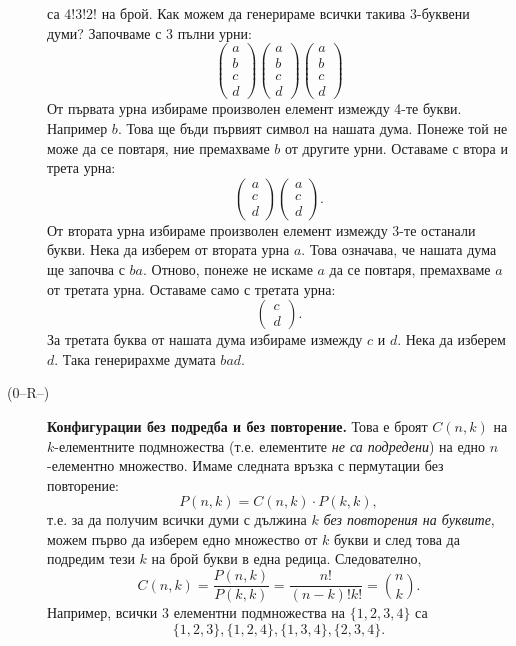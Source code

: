 \begin{description}
  са $4!3!2!$ на брой.
  Как можем да генерираме всички такива 3-буквени думи?
  Започваме с 3 пълни урни:
  \[
  \left(\begin{array}{c}
      a\\
      b\\
      c\\
      d
      \end{array}
    \right)
  \left(\begin{array}{c}
      a\\
      b\\
      c\\
      d
      \end{array}
    \right)
  \left(\begin{array}{c}
      a\\
      b\\
      c\\
      d
      \end{array}
    \right)
  \]
  От първата урна избираме произволен елемент измежду 4-те букви. Например $b$.
  Това ще бъди първият символ на нашата дума. Понеже той не може да се повтаря,
  ние премахваме $b$ от другите урни. Оставаме с втора и трета урна:
  \[
  \left(\begin{array}{c}
      a\\
      c\\
      d
      \end{array}
    \right)
  \left(\begin{array}{c}
      a\\
      c\\
      d
      \end{array}
    \right).
    \]
    От втората урна избираме произволен елемент измежду 3-те останали букви.
    Нека да изберем от втората урна $a$.
    Това означава, че нашата дума ще започва с $ba$.
    Отново, понеже не искаме $a$ да се повтаря, премахваме $a$ от третата урна. Оставаме само с третата урна:
      \[
      \left(\begin{array}{c}
          c\\
          d
        \end{array}
      \right).
    \]
    За третата буква от нашата дума избираме измежду $c$ и $d$.
    Нека да изберем $d$.
    Така генерирахме думата $bad$.
  \item[(0--R--)]
  {\bf Конфигурации без подредба и без повторение.}
  Това е броят $C(n,k)$ на $k$-елементните подмножества (т.е. елементите {\em не са подредени}) на едно $n$-елементно множество.
  Имаме следната връзка с пермутации без повторение:
  \[P(n,k) = C(n,k)\cdot P(k,k),\] 
  т.е. за да получим всички думи с дължина $k$ {\em без повторения на буквите},
  можем първо да изберем едно множество от $k$ букви и след това да подредим тези $k$ на брой букви в една редица.
  Следователно,
  \[C(n,k) =  \frac{P(n,k)}{P(k,k)} = \frac{n!}{(n-k)!k!} = \binom{n}{k}.\]
  Например, всички $3$ елементни подмножества на $\{1,2,3,4\}$ са
  \[\{1,2,3\},\{1,2,4\},\{1,3,4\},\{2,3,4\}.\]


\end{description}
